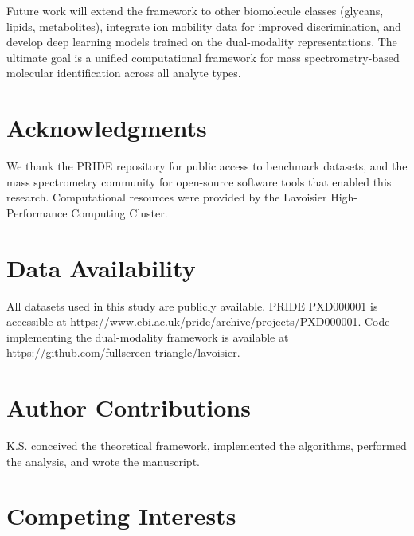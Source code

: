 \documentclass[11pt,twocolumn]{article}
\begin{document}
Future work will extend the framework to other biomolecule classes (glycans, lipids, metabolites), integrate ion mobility data for improved discrimination, and develop deep learning models trained on the dual-modality representations. The ultimate goal is a unified computational framework for mass spectrometry-based molecular identification across all analyte types.

\section*{Acknowledgments}

We thank the PRIDE repository for public access to benchmark datasets, and the mass spectrometry community for open-source software tools that enabled this research. Computational resources were provided by the Lavoisier High-Performance Computing Cluster.

\section*{Data Availability}

All datasets used in this study are publicly available. PRIDE PXD000001 is accessible at \url{https://www.ebi.ac.uk/pride/archive/projects/PXD000001}. Code implementing the dual-modality framework is available at \url{https://github.com/fullscreen-triangle/lavoisier}.

\section*{Author Contributions}

K.S. conceived the theoretical framework, implemented the algorithms, performed the analysis, and wrote the manuscript.

\section*{Competing Interests}
\end{document}
